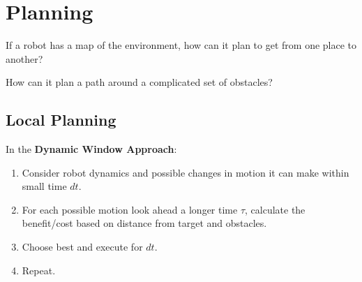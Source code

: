 \documentclass[11pt]{article}
\begin{document}
\section{Planning}
If a robot has a map of the environment, how can it plan to get from one place to another?

How can it plan a path around a complicated set of obstacles?

\subsection{Local Planning}
In the \textbf{Dynamic Window Approach}:
\begin{enumerate}
  \item Consider robot dynamics and possible changes in motion it can make within small time $dt$.
  \item For each possible motion look ahead a longer time $\tau$, calculate the benefit/cost based on distance from target and obstacles.
  \item Choose best and execute for $dt$.
  \item Repeat.
\end{enumerate}
\end{document}
